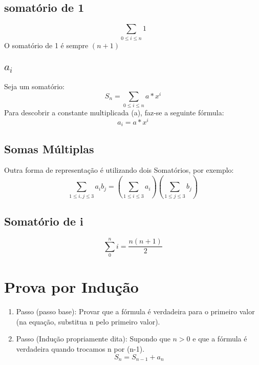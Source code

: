 \documentclass[12pt]{article}
\begin{document}
\subsection{somatório de 1}
\begingroup 
\LARGE
\begin{equation}
\sum_{0\leq i \leq n}1
\end{equation}
\endgroup
O somatório de 1 é sempre $(n+1)$
\subsection{$a_i$}
Seja um somatório:
\begingroup 
\LARGE
\begin{equation}
S_n = \sum_{0\leq i\leq n}a*x^i
\end{equation}
\endgroup
Para descobrir a constante multiplicada (a), faz-se a seguinte fórmula:
\begingroup 
\LARGE
\begin{equation}
a_i = a*x^i
\end{equation}
\endgroup
\subsection{Somas Múltiplas}
Outra forma de representação é utilizando dois Somatórios, por exemplo:
\begingroup 
\LARGE
\begin{equation}
\sum_{1\leq i,j\leq 3}a_ib_j = (\sum_{1\leq i\leq 3}a_i)(\sum_{1\leq j\leq 3}b_j)
\end{equation}
\endgroup
\subsection{Somatório de i}
\begingroup 
\LARGE
\begin{equation}
\sum_0^ni=\frac{n(n+1)}{2}
\end{equation}
\endgroup
\section{Prova por Indução}
\begin{enumerate}
    \item Passo (passo base): Provar que a fórmula é verdadeira para o primeiro valor
    (na equação, substitua n pelo primeiro valor).
    \item Passo (Indução propriamente dita): Supondo que $n>0$ e que a fórmula é verdadeira quando trocamos n por (n-1).
    \begingroup 
\LARGE
\begin{equation}
S_n = S_{n-1} + a_n
\end{equation}
\endgroup
\end{enumerate}
\end{document}
